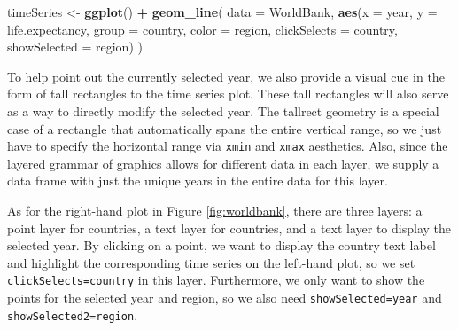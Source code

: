 \documentclass[12pt,]{article}
\newenvironment{Shaded}{\begin{snugshade}}{\end{snugshade}}
\newcommand{\DataTypeTok}[1]{\textcolor[rgb]{0.13,0.29,0.53}{#1}}
\newcommand{\FloatTok}[1]{\textcolor[rgb]{0.00,0.00,0.81}{#1}}
\newcommand{\KeywordTok}[1]{\textcolor[rgb]{0.13,0.29,0.53}{\textbf{#1}}}
\newcommand{\NormalTok}[1]{#1}
\newcommand{\OperatorTok}[1]{\textcolor[rgb]{0.81,0.36,0.00}{\textbf{#1}}}
\newcommand{\StringTok}[1]{\textcolor[rgb]{0.31,0.60,0.02}{#1}}
\theoremstyle{definition}
\theoremstyle{definition}
\theoremstyle{definition}
\theoremstyle{remark}
\begin{document}
\begin{Shaded}
\begin{Highlighting}[]
\NormalTok{timeSeries <-}\StringTok{ }\KeywordTok{ggplot}\NormalTok{() }\OperatorTok{+}\StringTok{ }\KeywordTok{geom_line}\NormalTok{(}
  \DataTypeTok{data =}\NormalTok{ WorldBank,}
  \KeywordTok{aes}\NormalTok{(}\DataTypeTok{x =}\NormalTok{ year, }\DataTypeTok{y =}\NormalTok{ life.expectancy,}
      \DataTypeTok{group =}\NormalTok{ country, }\DataTypeTok{color =}\NormalTok{ region,}
      \DataTypeTok{clickSelects =}\NormalTok{ country, }
      \DataTypeTok{showSelected =}\NormalTok{ region)}
\NormalTok{)}
\end{Highlighting}
\end{Shaded}

To help point out the currently selected year, we also provide a visual
cue in the form of tall rectangles to the time series plot. These tall
rectangles will also serve as a way to directly modify the selected
year. The tallrect geometry is a special case of a rectangle that
automatically spans the entire vertical range, so we just have to
specify the horizontal range via \texttt{xmin} and \texttt{xmax}
aesthetics. Also, since the layered grammar of graphics allows for
different data in each layer, we supply a data frame with just the
unique years in the entire data for this layer.

\begin{Shaded}
\end{Shaded}

As for the right-hand plot in Figure \ref{fig:worldbank}, there are
three layers: a point layer for countries, a text layer for countries,
and a text layer to display the selected year. By clicking on a point,
we want to display the country text label and highlight the
corresponding time series on the left-hand plot, so we set
\texttt{clickSelects=country} in this layer. Furthermore, we only want
to show the points for the selected year and region, so we also need
\texttt{showSelected=year} and \texttt{showSelected2=region}.
\end{document}
